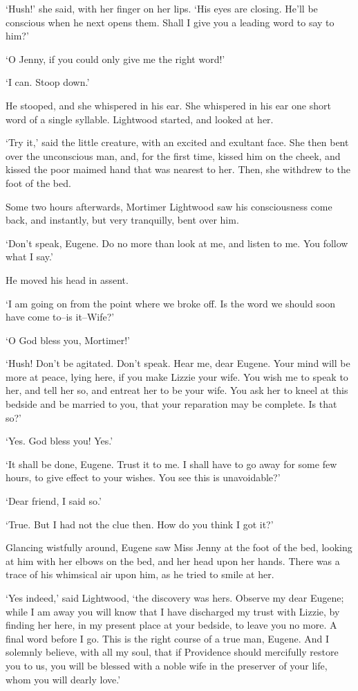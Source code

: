 ‘Hush!’ she said, with her finger on her lips. ‘His eyes are closing.
He’ll be conscious when he next opens them. Shall I give you a leading
word to say to him?’

‘O Jenny, if you could only give me the right word!’

‘I can. Stoop down.’

He stooped, and she whispered in his ear. She whispered in his ear one
short word of a single syllable. Lightwood started, and looked at her.

‘Try it,’ said the little creature, with an excited and exultant face.
She then bent over the unconscious man, and, for the first time, kissed
him on the cheek, and kissed the poor maimed hand that was nearest to
her. Then, she withdrew to the foot of the bed.

Some two hours afterwards, Mortimer Lightwood saw his consciousness come
back, and instantly, but very tranquilly, bent over him.

‘Don’t speak, Eugene. Do no more than look at me, and listen to me. You
follow what I say.’

He moved his head in assent.

‘I am going on from the point where we broke off. Is the word we should
soon have come to--is it--Wife?’

‘O God bless you, Mortimer!’

‘Hush! Don’t be agitated. Don’t speak. Hear me, dear Eugene. Your mind
will be more at peace, lying here, if you make Lizzie your wife. You
wish me to speak to her, and tell her so, and entreat her to be your
wife. You ask her to kneel at this bedside and be married to you, that
your reparation may be complete. Is that so?’

‘Yes. God bless you! Yes.’

‘It shall be done, Eugene. Trust it to me. I shall have to go away
for some few hours, to give effect to your wishes. You see this is
unavoidable?’

‘Dear friend, I said so.’

‘True. But I had not the clue then. How do you think I got it?’

Glancing wistfully around, Eugene saw Miss Jenny at the foot of the bed,
looking at him with her elbows on the bed, and her head upon her hands.
There was a trace of his whimsical air upon him, as he tried to smile at
her.

‘Yes indeed,’ said Lightwood, ‘the discovery was hers. Observe my dear
Eugene; while I am away you will know that I have discharged my trust
with Lizzie, by finding her here, in my present place at your bedside,
to leave you no more. A final word before I go. This is the right course
of a true man, Eugene. And I solemnly believe, with all my soul, that if
Providence should mercifully restore you to us, you will be blessed with
a noble wife in the preserver of your life, whom you will dearly love.’

